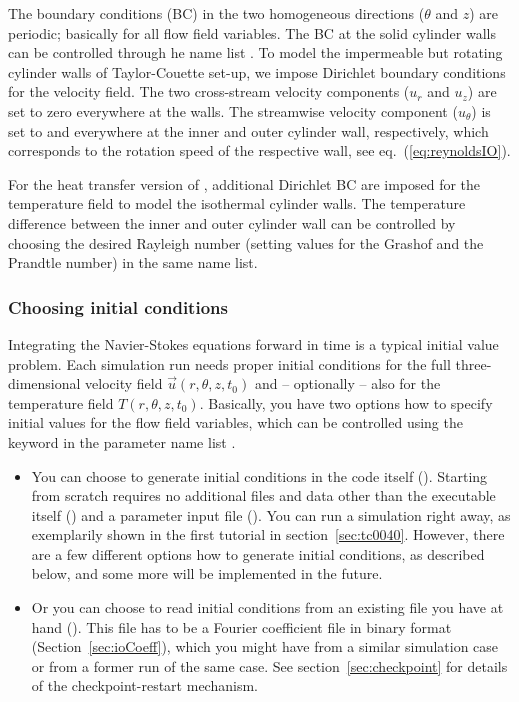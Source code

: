 \documentclass[a4paper, 11pt, DIV=11]{scrartcl}
\begin{document}
The boundary conditions (BC) in the two homogeneous directions ($\theta$ and $z$) are
periodic; basically for all flow field variables. The BC at the solid cylinder walls can be
controlled through he name list . To model the impermeable
but rotating cylinder walls of Taylor-Couette set-up, we impose Dirichlet boundary
conditions for the velocity field. The two cross-stream velocity components ($u_r$ and
$u_z$) are set to zero everywhere at the walls. The streamwise velocity component
($u_{\theta}$) is set to \Rei and \Reo everywhere at the inner and outer cylinder wall,
respectively, which corresponds to the rotation speed of the respective wall, see
eq.~(\ref{eq:reynoldsIO}).
\par
For the heat transfer version of \nsc, additional Dirichlet BC are imposed for the
temperature field to model the isothermal cylinder walls. The temperature difference
between the inner and outer cylinder wall can be controlled by choosing the desired
Rayleigh number (\ie setting values for the Grashof and the Prandtle number) in the
same name list.

\subsubsection{Choosing initial conditions}
\label{sec:initialConditions}

Integrating the Navier-Stokes equations forward in time is a typical initial
value problem. Each simulation run needs proper initial conditions for the
full three-dimensional velocity field $\vec{u}(r,\theta,z,t_0)$ and --
optionally -- also for the temperature field $T(r,\theta,z,t_0)$. Basically,
you have two options how to specify initial values for the flow field
variables, which can be controlled using the keyword  in the
parameter name list .
\begin{itemize}
\item
You can choose to generate initial conditions in the code itself
(). Starting from scratch requires no additional
files and data other than the executable itself ()
and a parameter input file (). You can run a
simulation right away, as exemplarily shown in the first tutorial
in section~\ref{sec:tc0040}. However, there are a few different
options how to generate initial conditions, as described below, and
some more will be implemented in the future.
\item
Or you can choose to read initial conditions from an existing file
you have at hand (). This file has to be a Fourier
coefficient file in binary format (Section~\ref{sec:ioCoeff}), which
you might have from a similar simulation case or from a former run
of the same case. See section~\ref{sec:checkpoint} for details of
the checkpoint-restart mechanism.
\end{itemize}
\end{document}
